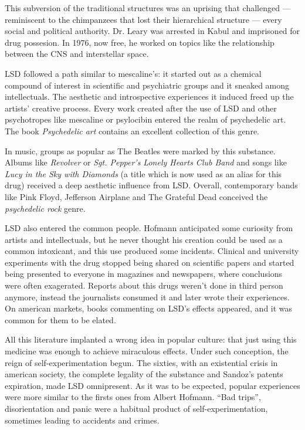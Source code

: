This subversion of the traditional structures was an uprising that challenged --- reminiscent to the chimpanzees that lost their hierarchical structure --- every social and political authority. Dr. Leary was arrested in Kabul and imprisoned for drug possesion. In 1976, now free, he worked on topics like the relationship between the CNS and interstellar space.

LSD followed a path similar to mescaline's: it started out as a chemical compound of interest in scientific and psychiatric groups and it sneaked among intellectuals. The aesthetic and introspective experiences it induced freed up the artists' creative process. Every work created after the use of LSD and other psychotropes like mescaline or psylocibin entered the realm of psychedelic art. The book \textit{Psychedelic art} contains an excellent collection of this genre.

In music, groups as popular as The Beatles were marked by this substance. Albums like \textit{Revolver} or \textit{Sgt. Pepper’s Lonely Hearts Club Band} and songs like \textit{Lucy in the Sky with Diamonds} (a title which is now used as an alias for this drug) received a deep aesthetic influence from LSD. Overall, contemporary bands like Pink Floyd, Jefferson Airplane and The Grateful Dead conceived the \textit{psychedelic rock} genre.

LSD also entered the common people. Hofmann anticipated some curiosity from artists and intellectuals, but he never thought his creation could be used as a common intoxicant, and this use produced some incidents. Clinical and university experiments with the drug stopped being shared on scientific papers and started being presented to everyone in magazines and newspapers, where conclusions were often exagerated. Reports about this drugs weren't done in third person anymore, instead the journalists consumed it and later wrote their experiences. On american markets, books commenting on LSD's effects appeared, and it was common for them to be elated.

All this literature implanted a wrong idea in popular culture: that just using this medicine was enough to achieve miraculous effects. Under such conception, the reign of self-experimentation begun. The sixties, with an existential crisis in american society, the complete legality of the substance and Sandoz's patents expiration, made LSD omnipresent. As it was to be expected, popular experiences were more similar to the firsts ones from Albert Hofmann. \enquote{Bad trips}, disorientation and panic were a habitual product of self-experimentation, sometimes leading to accidents and crimes.

